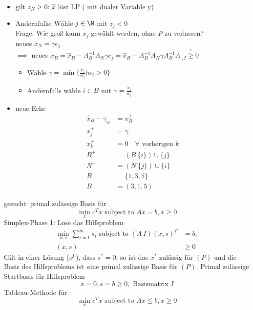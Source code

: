 \begin{itemize}
	\item gilt $z_{N} \geq 0$: $\hat{x}$ löst LP ( mit dualer Variable y)
	\item Andernfalls: Wähle $j\in \N$ mit $z_{j}<0$ \\
		Frage: Wie groß kann $x_{j}$ gewählt werden, ohne $P$ zu verlassen?\\
		neues $x_{N}= \gamma e_{j}$ \\
		$\implies$ neues $x_{B} = \hat{x}_{B}-A_{B}^{-1}A_{N}\gamma e_{j}= \hat{x}_{B}-A_{B}^{-1}A_{N}\gamma A_{B}^{-1}A_{\cdot,I} \overset{!}{\geq} 0$
		\begin{itemize}
			\item Wähle $\gamma = \min \{ \frac{\hat{x}_{i}}{w_{i}}|w_{i} > 0 \}$
			\item Andernfalls wähle $i \in B$ mit $\gamma = \frac{\hat{x}_{i}}{w_{i}}$
		\end{itemize} 
	\item neue Ecke
		\begin{align*}
			\hat{x}_{B}-\gamma_{w}&= x_{B}^+\\
			x_{j}^+& = \gamma\\
			x_{k}^+ &= 0 \quad \forall \text{ vorherigen } k\\
			B^+ &= (B \ \{i\})\cup \{j\}\\
			N^+ &= (N \ \{j\})\cup \{i\}\\
			B& = \{1,3,5\} \\
			B& = (3,1,5)
		\end{align*}
\end{itemize} 
gesucht: primal zulässige Basis für 
\begin{equation*}
	\min_{x} c^Tx \text{ subject to } Ax = b , x \geq 0
\end{equation*} 
Simplex-Phase 1: Löse das Hilfsproblem
\begin{align*}
	\min_{x,s} \sum_{i=1}^{m} s_{i} \text{ subject to } (A\ I) (x , s)^T & = b ,\\
	(x,s)& \geq 0
\end{align*} 
Gilt in einer Lösung ($x^0$), dass $s^* =0$, so ist das $x^*$ zulässig für $(P)$ und die Basis des Hilfsproblems \glqq ist\grqq\ eine primal zulässige Basis für $(P)$. 
Primal zulässige Startbasis für Hilfsproblem
\begin{equation*}
	x = 0, s = b \geq 0, \text{ Basismatrix } I
\end{equation*} 
Tableau-Methode für 
\begin{equation*}
	\min_{x}c^Tx \text{ subject to } Ax \leq b , x \geq 0
\end{equation*} 
